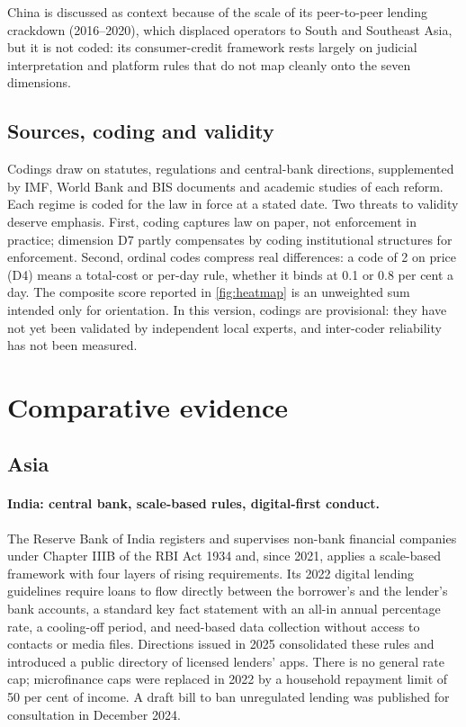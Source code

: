 \documentclass[11pt]{article}
\theoremstyle{plain}
\theoremstyle{definition}
\theoremstyle{remark}
\begin{document}
China is discussed as context because of the scale of its peer-to-peer lending crackdown (2016--2020), which displaced operators to South and Southeast Asia, but it is not coded: its consumer-credit framework rests largely on judicial interpretation and platform rules that do not map cleanly onto the seven dimensions.

\subsection{Sources, coding and validity}

Codings draw on statutes, regulations and central-bank directions, supplemented by IMF, World Bank and BIS documents and academic studies of each reform. Each regime is coded for the law in force at a stated date. Two threats to validity deserve emphasis. First, coding captures law on paper, not enforcement in practice; dimension D7 partly compensates by coding institutional structures for enforcement. Second, ordinal codes compress real differences: a code of 2 on price (D4) means a total-cost or per-day rule, whether it binds at 0.1 or 0.8 per cent a day. The composite score reported in \cref{fig:heatmap} is an unweighted sum intended only for orientation. In this version, codings are provisional: they have not yet been validated by independent local experts, and inter-coder reliability has not been measured.

\section{Comparative evidence}\label{sec:comparative}

\subsection{Asia}

\paragraph{India: central bank, scale-based rules, digital-first conduct.} The Reserve Bank of India registers and supervises non-bank financial companies under Chapter IIIB of the RBI Act 1934 and, since 2021, applies a scale-based framework with four layers of rising requirements. Its 2022 digital lending guidelines require loans to flow directly between the borrower's and the lender's bank accounts, a standard key fact statement with an all-in annual percentage rate, a cooling-off period, and need-based data collection without access to contacts or media files. Directions issued in 2025 consolidated these rules and introduced a public directory of licensed lenders' apps. There is no general rate cap; microfinance caps were replaced in 2022 by a household repayment limit of 50 per cent of income. A draft bill to ban unregulated lending was published for consultation in December 2024.
\end{document}
